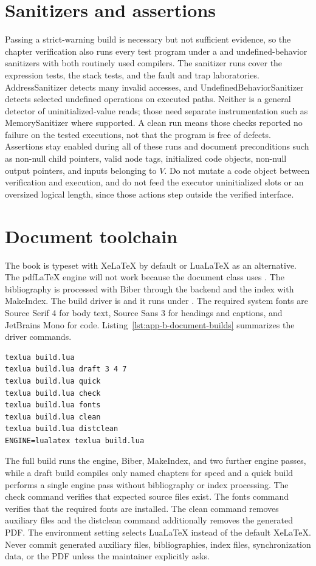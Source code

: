 \section{Sanitizers and assertions}
\label{sec:app-b-sanitizers}

Passing a strict-warning build is necessary but not sufficient evidence, so the chapter verification also runs every test program under a  and undefined-behavior sanitizers with both routinely used compilers.
The sanitizer runs cover the expression tests, the stack tests, and the fault and trap laboratories.
AddressSanitizer detects many invalid accesses, and UndefinedBehaviorSanitizer detects selected undefined operations on executed paths.
Neither is a general detector of uninitialized-value reads; those need separate instrumentation such as MemorySanitizer where supported.
A clean run means those checks reported no failure on the tested executions, not that the program is free of defects.
Assertions stay enabled during all of these runs and document preconditions such as non-null child pointers, valid node tags, initialized code objects, non-null output pointers, and inputs belonging to $V$.
Do not mutate a code object between verification and execution, and do not feed the executor uninitialized slots or an oversized logical length, since those actions step outside the verified interface.

\section{Document toolchain}
\label{sec:app-b-document-build}

The book is typeset with XeLaTeX by default or LuaLaTeX as an alternative.
The pdfLaTeX engine will not work because the document class uses .
The bibliography is processed with Biber through the  backend and the index with MakeIndex.
The build driver is  and it runs under .
The required system fonts are Source Serif 4 for body text, Source Sans 3 for headings and captions, and JetBrains Mono for code.
Listing~\ref{lst:app-b-document-builds} summarizes the driver commands.
\begin{lstlisting}[caption={Document build, check, and cleanup commands.},label={lst:app-b-document-builds}]
texlua build.lua
texlua build.lua draft 3 4 7
texlua build.lua quick
texlua build.lua check
texlua build.lua fonts
texlua build.lua clean
texlua build.lua distclean
ENGINE=lualatex texlua build.lua
\end{lstlisting}
The full build runs the engine, Biber, MakeIndex, and two further engine passes, while a draft build compiles only named chapters for speed and a quick build performs a single engine pass without bibliography or index processing.
The check command verifies that expected source files exist.
The fonts command verifies that the required fonts are installed.
The clean command removes auxiliary files and the distclean command additionally removes the generated PDF.
The  environment setting selects LuaLaTeX instead of the default XeLaTeX.
Never commit generated auxiliary files, bibliographies, index files, synchronization data, or the PDF unless the maintainer explicitly asks.

